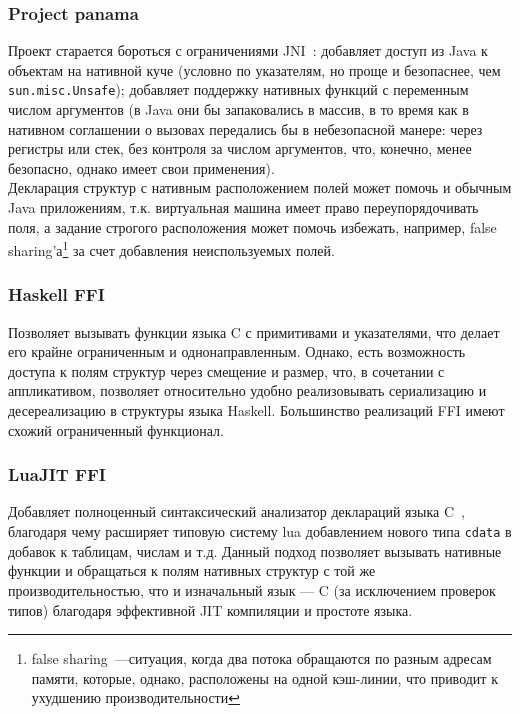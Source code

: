 \documentclass[times,specification,annotation]{itmo-student-thesis}
\begin{document}
\subsubsection{Project panama}
Проект старается бороться с ограничениями JNI~\cite{project-panama-overview}: добавляет доступ из Java к объектам на нативной куче (условно по указателям, но проще и безопаснее, чем \texttt{sun.misc.Unsafe}); добавляет поддержку нативных функций с переменным числом аргументов (в Java они бы запаковались в массив, в то время как в нативном соглашении о вызовах передались бы в небезопасной манере: через регистры или стек, без контроля за числом аргументов, что, конечно, менее безопасно, однако имеет свои применения).\\
Декларация структур с нативным расположением полей может помочь и обычным Java приложениям, т.к. виртуальная машина имеет право переупорядочивать поля, а задание строгого расположения может помочь избежать, например, false sharing'а\footnote{false sharing~---ситуация, когда два потока обращаются по разным адресам памяти, которые, однако, расположены на одной кэш-линии, что приводит к ухудшению производительности} за счет добавления неиспользуемых полей.
\subsubsection{Haskell FFI}
Позволяет вызывать функции языка C с примитивами и указателями, что делает его крайне ограниченным и однонаправленным. Однако, есть возможность доступа к полям структур через смещение и размер, что, в сочетании с аппликативом, позволяет относительно удобно реализовывать сериализацию и десереализацию в структуры языка Haskell. Большинство реализаций FFI имеют схожий ограниченный функционал.
\subsubsection{LuaJIT FFI}\label{intro:luajitffi}
Добавляет полноценный синтаксический анализатор деклараций языка C~\cite{luajit}, благодаря чему расширяет типовую систему lua добавлением нового типа \texttt{cdata} в добавок к таблицам, числам и т.д. Данный подход позволяет вызывать нативные функции и обращаться к полям нативных структур с той же производительностью, что и изначальный язык --- C (за исключением проверок типов) благодаря эффективной JIT компиляции и простоте языка.
\end{document}
